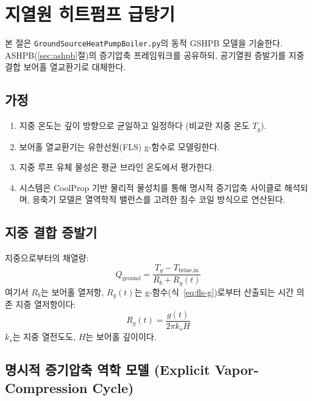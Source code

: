 \section{지열원 히트펌프 급탕기}
\label{sec:gshpb}

본 절은 \texttt{GroundSourceHeatPumpBoiler.py}의 동적 GSHPB 모델을 기술한다. ASHPB(\ref{sec:ashpb}절)의 증기압축 프레임워크를 공유하되, 공기열원 증발기를 지중 결합 보어홀 열교환기로 대체한다.

\subsection{가정}
\begin{enumerate}
  \item 지중 온도는 깊이 방향으로 균일하고 일정하다 (비교란 지중 온도 $T_g$).
  \item 보어홀 열교환기는 유한선원(FLS) g-함수로 모델링한다.
  \item 지중 루프 유체 물성은 평균 브라인 온도에서 평가한다.
  \item 시스템은 CoolProp 기반 물리적 물성치를 통해 명시적 증기압축 사이클로 해석되며, 응축기 모델은 열역학적 밸런스를 고려한 침수 코일 방식으로 연산된다.
\end{enumerate}

\subsection{지중 결합 증발기}

지중으로부터의 채열량:
\begin{equation}\label{eq:gshp-Qground}
  Q_\text{ground} = \frac{T_g - T_\text{brine,in}}{R_b + R_g(t)}
\end{equation}
여기서 $R_b$는 보어홀 열저항, $R_g(t)$는 g-함수(식~\ref{eq:fls-g})로부터 산출되는 시간 의존 지중 열저항이다:
\begin{equation}\label{eq:gshp-Rg}
  R_g(t) = \frac{g(t)}{2\pi k_s H}
\end{equation}
$k_s$는 지중 열전도도, $H$는 보어홀 깊이이다.

\subsection{명시적 증기압축 역학 모델 (Explicit Vapor-Compression Cycle)}

